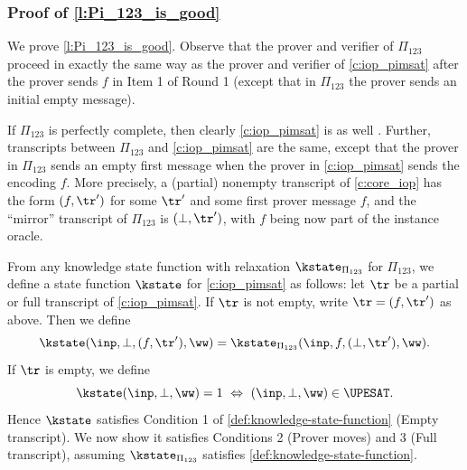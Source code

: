 
%


\subsubsection{Proof of \cref{l:Pi_123_is_good}}\label{a:Pi_123_is_good}

 We prove \cref{l:Pi_123_is_good}. Observe that the prover and verifier of $\Pi_{123}$ proceed in exactly the same way as the prover and verifier of \cref{c:iop_pimsat} after the prover sends $f$ in Item 1 of Round 1 (except that in $\Pi_{123}$ the prover sends an initial empty message).  

If $\Pi_{123}$ is perfectly complete, then clearly \cref{c:iop_pimsat} is as well . Further,  transcripts between $\Pi_{123}$ and \cref{c:iop_pimsat} are the same, except that the prover in $\Pi_{123}$ sends an empty first message when the prover in \cref{c:iop_pimsat} sends the encoding $f$. More precisely, a (partial) nonempty transcript of \cref{c:core_iop} has the form $(f,\tr')$ for some $\tr'$ and some first prover message $f$, and the ``mirror'' transcript of $\Pi_{123}$ is $(\bot,\tr')$, with $f$ being now part of the instance oracle.

From any knowledge state function with relaxation $\kstate_{\Pi_{123}}$ for $\Pi_{123}$, we  define a state function $\kstate$ for \cref{c:iop_pimsat} as follows: let $\tr$ be a partial  or full transcript of \cref{c:iop_pimsat}. If $\tr$ is not empty, write $\tr=(f,\tr')$ as above. Then we define
%
$$
\kstate(\inp,\bot, (f,\tr'), \ww) = \kstate_{\Pi_{123}}(\inp, f, (\bot, \tr'), \ww).$$ 
%
If $\tr$ is empty, we define
%
$$
\kstate(\inp,\bot, \ww) = 1 \ \Leftrightarrow \ (\inp,\bot,\ww) \in \UPESAT.
$$
%
Hence $\kstate$ satisfies Condition 1 of \cref{def:knowledge-state-function} (Empty transcript). We now show it satisfies Conditions 2 (Prover moves) and 3 (Full transcript), assuming $\kstate_{\Pi_{123}}$ satisfies \cref{def:knowledge-state-function}. 

